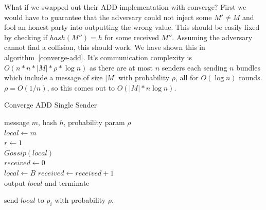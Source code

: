 \documentclass{article}
\begin{document}
What if we swapped out their ADD implementation with converge? First we would have to guarantee that the adversary could not inject some $M' \neq M$ and fool an honest party into outputting the wrong value. This should be easily fixed by checking if $hash(M'') = h$ for some received $M''$. Assuming the adversary cannot find a collision, this should work. We have shown this in algorithm~\ref{converge-add}. It's communication complexity is $O(n * n * |M| * \rho * \log n)$ as there are at most $n$ senders each sending $n$ bundles which include a message of size $|M|$ with probability $\rho$, all for $O(\log n)$ rounds. $\rho = O(1/n)$, so this comes out to $O(|M| * n \log n)$.

\begin{algorithm}\label{converge-add}
\caption{Converge ADD Single Sender}



\Input message $m$, hash $h$, probability param $\rho$\\
$local \leftarrow m$ \\
$r \leftarrow 1$\\
$Gossip(local)$\\
$received \leftarrow 0$\\

{
	{
		$local \leftarrow B$
	}
	$received \leftarrow received + 1$\\
	{
		{
			output $local$ and terminate
		}
	}
}

{
	{
		{
			send $local$ to $p_i$ with probability $\rho$.
		}
	}

}

\SetAlgoLined
\SetAlgoNoEnd
\end{algorithm}




\end{document}
